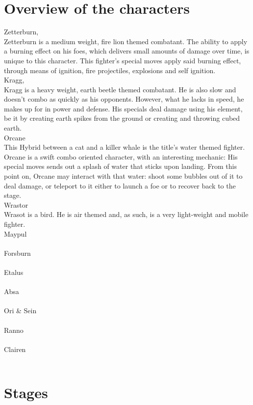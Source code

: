 \documentclass[11pt]{article}
\begin{document}
\chapter{Overview of the characters}
Zetterburn,\\
Zetterburn is a medium weight, fire lion themed combatant. The ability to apply a burning effect on his foes, which delivers small amounts of damage over time, is unique to this character. This fighter's special moves apply said burning effect, through means of ignition, fire projectiles, explosions and self ignition.\\
Kragg,\\
Kragg is a heavy weight, earth beetle themed combatant. He is also slow and doesn't combo as quickly as his opponents. However, what he lacks in speed, he makes up for in power and defense. His specials deal damage using his element, be it by creating earth spikes from the ground or creating and throwing cubed earth.\\
Orcane\\
This Hybrid between a cat and a killer whale is the title's water themed fighter. Orcane is a swift combo oriented character, with an interesting mechanic: His special moves sends out a splash of water that sticks upon landing. From this point on, Orcane may interact with that water: shoot some bubbles out of it to deal damage, or teleport to it either to launch a foe or to recover back to the stage.\\
Wrastor\\
Wrasot is a bird. He is air themed and, as such, is a very light-weight and mobile fighter. 
\\
Maypul\\
\\
Forsburn\\
\\
Etalus\\
\\
Absa\\
\\
Ori & Sein\\
\\
Ranno\\
\\
Clairen\\
\\

\chapter{Stages}
\end{document}
